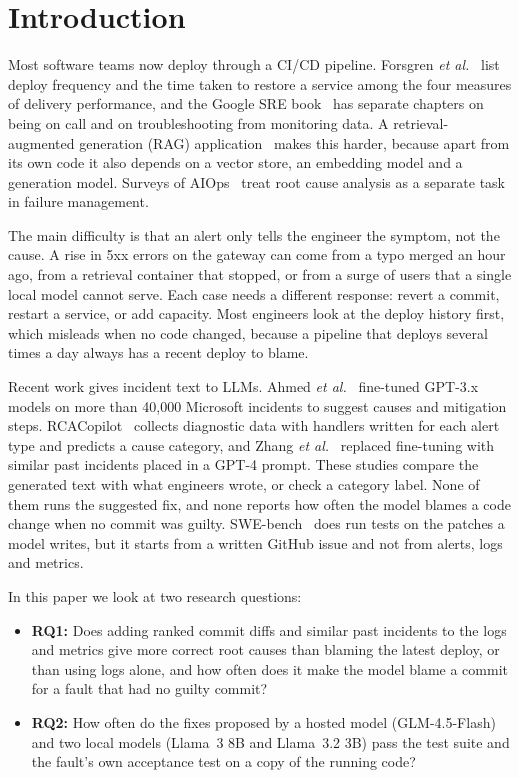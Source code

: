 \documentclass[12pt,onecolumn,draftclsnofoot]{IEEEtran}
\begin{document}
\section{Introduction}

Most software teams now deploy through a CI/CD pipeline. Forsgren \emph{et al.}~\cite{forsgren2018accelerate} list deploy frequency and the time taken to restore a service among the four measures of delivery performance, and the Google SRE book~\cite{beyer2016sre} has separate chapters on being on call and on troubleshooting from monitoring data. A retrieval-augmented generation (RAG) application~\cite{lewis2020rag} makes this harder, because apart from its own code it also depends on a vector store, an embedding model and a generation model. Surveys of AIOps~\cite{notaro2021aiops,soldani2022survey} treat root cause analysis as a separate task in failure management.

The main difficulty is that an alert only tells the engineer the symptom, not the cause. A rise in 5xx errors on the gateway can come from a typo merged an hour ago, from a retrieval container that stopped, or from a surge of users that a single local model cannot serve. Each case needs a different response: revert a commit, restart a service, or add capacity. Most engineers look at the deploy history first, which misleads when no code changed, because a pipeline that deploys several times a day always has a recent deploy to blame.

Recent work gives incident text to LLMs. Ahmed \emph{et al.}~\cite{ahmed2023recommending} fine-tuned GPT-3.x models on more than 40,000 Microsoft incidents to suggest causes and mitigation steps. RCACopilot~\cite{chen2024rcacopilot} collects diagnostic data with handlers written for each alert type and predicts a cause category, and Zhang \emph{et al.}~\cite{zhang2024icl} replaced fine-tuning with similar past incidents placed in a GPT-4 prompt. These studies compare the generated text with what engineers wrote, or check a category label. None of them runs the suggested fix, and none reports how often the model blames a code change when no commit was guilty. SWE-bench~\cite{jimenez2024swebench} does run tests on the patches a model writes, but it starts from a written GitHub issue and not from alerts, logs and metrics.

In this paper we look at two research questions:
\begin{itemize}
\item \textbf{RQ1:} Does adding ranked commit diffs and similar past incidents to the logs and metrics give more correct root causes than blaming the latest deploy, or than using logs alone, and how often does it make the model blame a commit for a fault that had no guilty commit?
\item \textbf{RQ2:} How often do the fixes proposed by a hosted model (GLM-4.5-Flash) and two local models (Llama~3 8B and Llama~3.2 3B) pass the test suite and the fault's own acceptance test on a copy of the running code?
\end{itemize}
\end{document}
